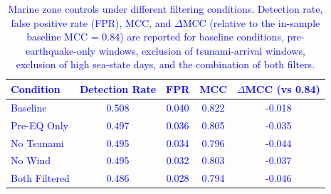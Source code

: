 \documentclass[preprint,review,12pt,authoryear]{elsarticle}
\providecommand{\DIFaddtex}[1]{{\sf #1}} %
\providecommand{\DIFaddend}{} %
\providecommand{\DIFaddFL}[1]{\DIFadd{#1}} %
\providecommand{\DIFadd}[1]{\texorpdfstring{\DIFaddtex{#1}}{#1}} %
\DeclareRobustCommand{\DIFaddend}{\DIFOaddend \let\includegraphics\DIFOincludegraphics} %
\renewcommand{\DIFaddtex}[1]{\textcolor{blue}{#1}}
\begin{document}
\begin{table}[p]
\footnotesize
\centering
\caption{\DIFaddFL{Marine zone controls under different filtering conditions. Detection rate, false positive rate (FPR), MCC, and $\Delta$MCC (relative to the in-sample baseline MCC = 0.84) are reported for baseline conditions, pre-earthquake-only windows, exclusion of tsunami-arrival windows, exclusion of high sea-state days, and the combination of both filters.}}
\label{tab:tableS3}
\begin{tabular}{@{}lcccc@{}}
\toprule
\DIFaddFL{Condition      }& \DIFaddFL{Detection Rate }& \DIFaddFL{FPR   }& \DIFaddFL{MCC   }& \DIFaddFL{$\Delta$MCC (vs 0.84) }\\
\midrule
\DIFaddFL{Baseline       }& \DIFaddFL{0.508          }& \DIFaddFL{0.040 }& \DIFaddFL{0.822 }& \DIFaddFL{-0.018                }\\
\DIFaddFL{Pre-EQ Only    }& \DIFaddFL{0.497          }& \DIFaddFL{0.036 }& \DIFaddFL{0.805 }& \DIFaddFL{-0.035                }\\
\DIFaddFL{No Tsunami     }& \DIFaddFL{0.495          }& \DIFaddFL{0.034 }& \DIFaddFL{0.796 }& \DIFaddFL{-0.044                }\\
\DIFaddFL{No Wind        }& \DIFaddFL{0.495          }& \DIFaddFL{0.032 }& \DIFaddFL{0.803 }& \DIFaddFL{-0.037                }\\
\DIFaddFL{Both Filtered  }& \DIFaddFL{0.486          }& \DIFaddFL{0.028 }& \DIFaddFL{0.794 }& \DIFaddFL{-0.046                }\\
\bottomrule
\end{tabular}
\end{table}
\clearpage

\begin{table}[p]
\footnotesize
\centering
\caption{\DIFaddFL{Stratified performance (2$\times$2) by magnitude and depth for M$\ge$7.0 earthquakes. We report MCC and FPR with 95\% confidence intervals (CI). $\Delta$ values are computed relative to the overall mean (window-weighted) performance (MCC = 0.804; FPR = 0.038).}}
\label{tab:tableS4}
\end{table}
\clearpage
\DIFaddend 
\end{document}
